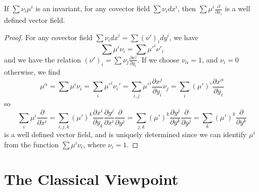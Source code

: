 \begin{theorem}
    If $\sum \nu_i \mu^i$ is an invariant, for any covector field $\sum \nu_i dx^i$, then $\sum \mu^i \frac{\partial}{\partial x_i}$ is a well defined vector field.
\end{theorem}
\begin{proof}
    For any covector field $\sum \nu_i dx^i = \sum (\nu')_i dy^i$, we have
    \[ \sum \mu^i \nu_i = \sum \mu'^i \nu'_i \]
    and we have the relation $(\nu')_i = \sum \nu_j \frac{\partial x^j}{\partial y_i}$. If we choose $\nu_\alpha = 1$, and $\nu_i = 0$ otherwise, we find
    \[ \mu^\alpha = \sum \mu^i \nu_i = \sum_i \mu'^i \nu_i' = \sum_{i,j} \mu'^i \frac{\partial x^j}{\partial y_i} \nu_j = \sum_i (\mu')^i \frac{\partial x^\alpha}{\partial y_i} \]
    so
    \[ \sum_i \mu^i \frac{\partial}{\partial x^i} = \sum_{i,j,k} (\mu')^k \frac{\partial x^i}{\partial y_k} \frac{\partial y^j}{\partial x^i} \frac{\partial}{\partial y^j} = \sum_{j,k} (\mu')^k \frac{\partial y^j}{\partial y^k} \frac{\partial}{\partial y^j} = \sum_k (\mu')^k \frac{\partial}{\partial y^k} \]
    is a well defined vector field, and is uniquely determined since we can identify $\mu^i$ from the function $\sum \mu^i \nu_i$, where $\nu_i = 1$.
\end{proof}

\section{The Classical Viewpoint}

